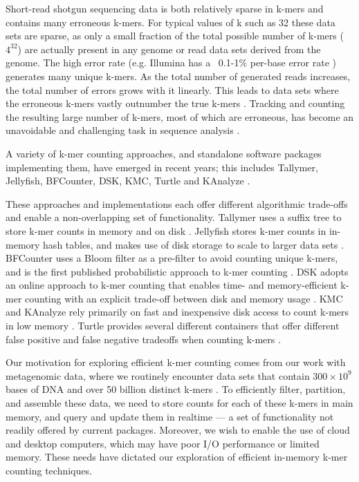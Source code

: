 \documentclass[10pt]{article}
\begin{document}

Short-read shotgun sequencing data is both relatively sparse in k-mers
and contains many erroneous k-mers.  For typical values of k such as
32 these data sets are sparse, as only a small fraction of the total
possible number of k-mers ($4^{32}$) are actually present in any
genome or read data sets derived from the genome.  The high error rate
(e.g. Illumina has a ~0.1-1\% per-base error rate
\cite{pubmed19997069}) generates many unique k-mers.  As the total
number of generated reads increases, the total number of errors grows
with it linearly. This leads to data sets where the erroneous k-mers
vastly outnumber the true k-mers \cite{Conway2011}.  Tracking and
counting the resulting large number of k-mers, most of which are
erroneous, has become an unavoidable and challenging task in sequence
analysis \cite{Minoche2011}.

A variety of k-mer counting approaches, and standalone software
packages implementing them, have emerged in recent years; this
includes Tallymer, Jellyfish, BFCounter, DSK, KMC, Turtle and KAnalyze
\cite{Kurtz2008, Marcais2011, Melsted2011, Rizk2013, Deorowicz2013,
  Roy2014, Audano2014}.

These approaches and implementations each offer different algorithmic
trade-offs and enable a non-overlapping set of functionality.
Tallymer uses a suffix tree to store k-mer counts in memory and on
disk \cite{Kurtz2008}.  Jellyfish stores k-mer counts in in-memory
hash tables, and makes use of disk storage to scale to larger data
sets \cite{Marcais2011}.  BFCounter uses a Bloom filter as a
pre-filter to avoid counting unique k-mers, and is the first published
probabilistic approach to k-mer counting \cite{Melsted2011}.  DSK
adopts an online approach to k-mer counting that enables time- and
memory-efficient k-mer counting with an explicit trade-off between
disk and memory usage \cite{Rizk2013}.  KMC and KAnalyze rely
primarily on fast and inexpensive disk access to count k-mers in low
memory \cite{Deorowicz2013,Audano2014}.  Turtle provides several
different containers that offer different false positive and false
negative tradeoffs when counting k-mers \cite{Roy2014}.

Our motivation for exploring efficient k-mer counting comes from our
work with metagenomic data, where we routinely encounter data sets
that contain $300 \times 10^9$ bases of DNA and over 50 billion
distinct k-mers \cite{Howe2012}.  To efficiently filter, partition,
and assemble these data, we need to store counts for each of these
k-mers in main memory, and query and update them in realtime --- a set
of functionality not readily offered by current packages.  Moreover,
we wish to enable the use of cloud and desktop computers, which may
have poor I/O performance or limited memory. These needs have dictated
our exploration of efficient in-memory k-mer counting techniques.
\end{document}
